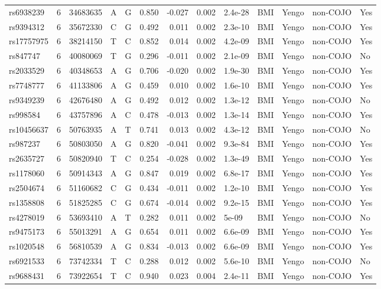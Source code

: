 \documentclass[11pt,twoside]{bristolthesis}
\begin{document}
\begin{longtable}[t]{lrlllrrrlllll}
rs6938239 & 6 & 34683635 & A & G & 0.850 & -0.027 & 0.002 & 2.4e-28 & BMI & Yengo & non-COJO & Yes\\
\addlinespace
rs9394312 & 6 & 35672330 & C & G & 0.492 & 0.011 & 0.002 & 2.3e-10 & BMI & Yengo & non-COJO & Yes\\
rs17757975 & 6 & 38214150 & T & C & 0.852 & 0.014 & 0.002 & 4.2e-09 & BMI & Yengo & non-COJO & Yes\\
rs847747 & 6 & 40080069 & T & G & 0.296 & -0.011 & 0.002 & 2.1e-09 & BMI & Yengo & non-COJO & No\\
rs2033529 & 6 & 40348653 & A & G & 0.706 & -0.020 & 0.002 & 1.9e-30 & BMI & Yengo & non-COJO & Yes\\
rs7748777 & 6 & 41133806 & A & G & 0.459 & 0.010 & 0.002 & 1.6e-10 & BMI & Yengo & non-COJO & Yes\\
\addlinespace
rs9349239 & 6 & 42676480 & A & G & 0.492 & 0.012 & 0.002 & 1.3e-12 & BMI & Yengo & non-COJO & No\\
rs998584 & 6 & 43757896 & A & C & 0.478 & -0.013 & 0.002 & 1.3e-14 & BMI & Yengo & non-COJO & Yes\\
rs10456637 & 6 & 50763935 & A & T & 0.741 & 0.013 & 0.002 & 4.3e-12 & BMI & Yengo & non-COJO & No\\
rs987237 & 6 & 50803050 & A & G & 0.820 & -0.041 & 0.002 & 9.3e-84 & BMI & Yengo & non-COJO & Yes\\
rs2635727 & 6 & 50820940 & T & C & 0.254 & -0.028 & 0.002 & 1.3e-49 & BMI & Yengo & non-COJO & Yes\\
\addlinespace
rs1178060 & 6 & 50914343 & A & G & 0.847 & 0.019 & 0.002 & 6.8e-17 & BMI & Yengo & non-COJO & Yes\\
rs2504674 & 6 & 51160682 & C & G & 0.434 & -0.011 & 0.002 & 1.2e-10 & BMI & Yengo & non-COJO & Yes\\
rs1358808 & 6 & 51825285 & C & G & 0.674 & -0.014 & 0.002 & 9.2e-15 & BMI & Yengo & non-COJO & Yes\\
rs4278019 & 6 & 53693410 & A & T & 0.282 & 0.011 & 0.002 & 5e-09 & BMI & Yengo & non-COJO & No\\
rs9475173 & 6 & 55013291 & A & G & 0.654 & 0.011 & 0.002 & 6.6e-09 & BMI & Yengo & non-COJO & Yes\\
\addlinespace
rs1020548 & 6 & 56810539 & A & G & 0.834 & -0.013 & 0.002 & 6.6e-09 & BMI & Yengo & non-COJO & Yes\\
rs6921533 & 6 & 73742334 & T & C & 0.288 & 0.012 & 0.002 & 5.6e-10 & BMI & Yengo & non-COJO & No\\
rs9688431 & 6 & 73922654 & T & C & 0.940 & 0.023 & 0.004 & 2.4e-11 & BMI & Yengo & non-COJO & Yes\\

\end{longtable}
\end{document}
